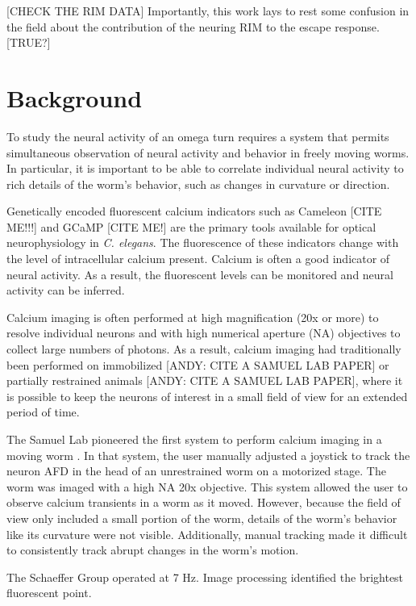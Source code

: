 [CHECK THE RIM DATA] Importantly, this work lays to rest some confusion in the field about the contribution of the neuring RIM to the escape response.  [TRUE?]






 

\section{Background}
To study the neural activity of an omega turn requires a system that permits simultaneous observation of neural activity and behavior in freely moving worms.  In particular, it is important to be able to correlate individual neural activity to rich details of the worm's behavior, such as changes in curvature or direction.


Genetically encoded fluorescent calcium indicators such as Cameleon [CITE ME!!!] and GCaMP [CITE ME!] are the primary tools available for optical neurophysiology in \textit{C. elegans}.  The fluorescence of these indicators change with the level of intracellular calcium present. Calcium is often a good indicator of neural activity. As a result, the fluorescent levels can be monitored and neural activity can be inferred.


Calcium imaging is often performed at high magnification (20x or more)  to resolve individual neurons and with high numerical aperture (NA) objectives to collect large numbers of photons. As a result, calcium imaging had traditionally been  performed on immobilized  [ANDY: CITE A SAMUEL LAB PAPER] or partially restrained animals  [ANDY: CITE A SAMUEL LAB PAPER], where it is possible to keep the neurons of interest in a small field of view for an extended period of time. 

The Samuel Lab pioneered the first system to perform calcium imaging in a moving worm \citep{clark_temporal_2007}. In that system, the user manually adjusted a joystick to track the neuron AFD in the head of an unrestrained worm on a motorized stage. The worm was imaged with a high NA 20x objective. This system allowed the user to observe calcium transients in a worm as it moved. However, because the field of view only included a small portion of the worm, details of the worm's behavior like its curvature were not visible.  Additionally, manual tracking made it difficult to consistently track abrupt changes in the worm's  motion.

The Schaeffer Group  operated at 7 Hz. Image processing identified the brightest fluorescent point. \citep{ben_arous_automated_2010}


